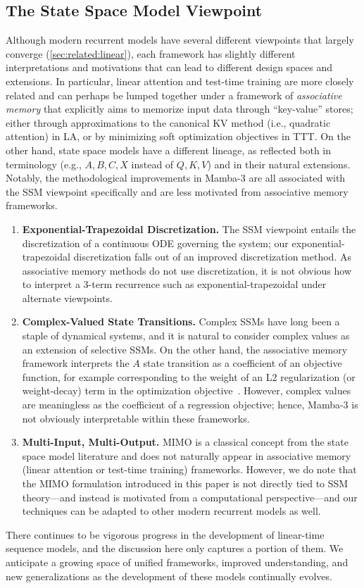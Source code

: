 \subsection{The State Space Model Viewpoint}

Although modern recurrent models have several different viewpoints that largely converge (\cref{sec:related:linear}),
each framework has slightly different interpretations and motivations that can lead to different design spaces and extensions.
In particular, linear attention and test-time training are more closely related and can perhaps be lumped together under a framework of \emph{associative memory} that explicitly aims to memorize input data through ``key-value'' stores;
either through approximations to the canonical KV method (i.e., quadratic attention) in LA,
or by minimizing soft optimization objectives in TTT.
On the other hand, state space models have a different lineage, as reflected both in terminology (e.g., $A,B,C,X$ instead of $Q,K,V$) and in their natural extensions.
Notably, the methodological improvements in Mamba-3 are all associated with the SSM viewpoint specifically and are less motivated from associative memory frameworks.

\begin{enumerate}
    \item \textbf{Exponential-Trapezoidal Discretization.}
    The SSM viewpoint entails the discretization of a continuous ODE governing the system;
    our exponential-trapezoidal discretization falls out of an improved discretization method.
    As associative memory methods do not use discretization, it is not obvious how to interpret a 3-term recurrence such as exponential-trapezoidal under alternate viewpoints.
    \item \textbf{Complex-Valued State Transitions.}
    Complex SSMs have long been a staple of dynamical systems, and it is natural to consider complex values as an extension of selective SSMs.
    On the other hand, the associative memory framework interprets the $A$ state transition as a coefficient of an objective function, for example corresponding to the weight of an L2 regularization (or weight-decay) term in the optimization objective~\citep{wang2025testtimeregressionunifyingframework}.
    However, complex values are meaningless as the coefficient of a regression objective;
    hence, Mamba-3 is not obviously interpretable within these frameworks.
    \item \textbf{Multi-Input, Multi-Output.}
    MIMO is a classical concept from the state space model literature and does not naturally appear in associative memory (linear attention or test-time training) frameworks.
    However, we do note that the MIMO formulation introduced in this paper is not directly tied to SSM theory---and instead is motivated from a computational perspective---and our techniques can be adapted to other modern recurrent models as well.
\end{enumerate}

There continues to be vigorous progress in the development of linear-time sequence models, and the discussion here only captures a portion of them.
We anticipate a growing space of unified frameworks, improved understanding, and new generalizations as the development of these models continually evolves.
